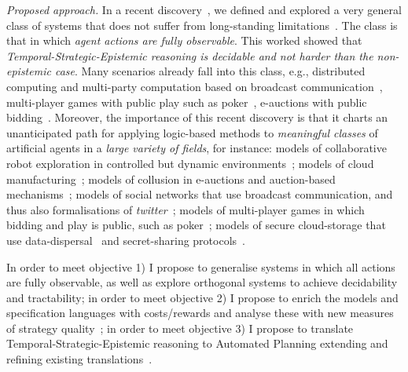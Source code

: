 \documentclass[a4paper,10pt]{scrartcl}
\def\TSE{Temporal-Strategic-Epistemic\xspace}
\begin{document}

\emph{Proposed approach.}
In a recent discovery~, we defined and explored a very general class of systems that does not suffer from long-standing limitations~\cite{DBLP:conf/focs/PnueliR90}. The class is that in which \emph{agent actions are fully observable}. This worked showed that \emph{\TSE reasoning is decidable and not harder than the non-epistemic case}. Many scenarios already fall into this class, e.g., distributed computing and multi-party computation based on broadcast communication~\cite{DBLP:books/mk/Lynch96, ADGH06}, multi-player games with public play such as poker~\cite{Bowling145}, e-auctions with public bidding~\cite{EasleyK10}. Moreover, the importance of this recent discovery is that it charts an unanticipated path for applying logic-based methods to 
\emph{meaningful classes} of artificial agents in a \emph{large variety of fields}, for instance: models of collaborative robot exploration in controlled but dynamic environments~\cite{amazon};  models of cloud manufacturing~\cite{DBLP:conf/ijcai/FelliSLR17};  models of collusion in e-auctions and auction-based mechanisms~\cite{EasleyK10};  models of social networks that use broadcast communication, and thus also formalisations of \emph{twitter}~\cite{DeNicola2015,DBLP:journals/jlp/MaggiPST17}; models of multi-player games in which bidding and play is public, such as poker~\cite{Bowling145}; models of secure cloud-storage that use data-dispersal~\cite{DBLP:journals/internet/LiQLL16} and secret-sharing protocols~\cite{ADGH06}. 

In order to meet objective 1) I propose to generalise systems in which all actions are fully observable, as well as explore orthogonal systems to achieve decidability and tractability; in order to meet objective 2) I propose to enrich the models and specification languages with costs/rewards and analyse these with new measures of strategy quality~\cite{ABK16,DBLP:journals/corr/BrafmanGP17,DBLP:journals/acta/BrihayeGHM17}; in order to meet objective 3) I propose to translate Temporal-Strategic-Epistemic reasoning to Automated Planning extending and refining existing translations~\cite{DBLP:conf/aaai/BaierM06,TorresB15,Camacho17}.
\end{document}
